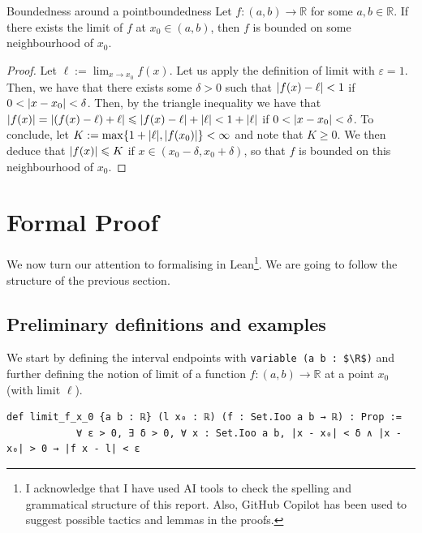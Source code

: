 \documentclass[a4paper,11pt]{article}
\theoremstyle{plain}
\newcommand{\R}{\ensuremath{\mathbb{R}}} %
\begin{document}
	\begin{lemma}{Boundedness around a point}{boundedness}
		\label{lem:boundedness}
		Let $f:(a,b)\rightarrow \R$ for some $a,b\in\R$. If there exists the limit of $f$ at $x_0\in(a,b)$, then $f$ is bounded on some neighbourhood of $x_0$.
	\end{lemma}
	\begin{proof}
		Let $\ell:=\lim_{x\rightarrow x_0}f(x)$. Let us apply the definition of limit with $\varepsilon=1$. Then, we have that there exists some $\delta>0$ such that $\abs{f(x)- \ell} < 1$ if $0 < \abs{x-x_0} < \delta$. Then, by the triangle inequality we have that $\abs{f(x)}= \abs{(f(x)-\ell) + \ell}\leqslant \abs{f(x)-\ell}+\abs{\ell}< 1 + \abs{\ell}$ if $0 < \abs{x-x_0} < \delta$. To conclude, let $K:=\max\{1 + \abs{\ell}, \abs{f(x_0)}\}<\infty$ and note that $K\geqslant0$. We then deduce that $\abs{f(x)}\leqslant K$ if $x \in (x_0-\delta, x_0 + \delta)$, so that $f$ is bounded on this neighbourhood of $x_0$.
	\end{proof}
	
	\section{Formal Proof}\label{sec:formal}
	 
	 We now turn our attention to formalising  in Lean\footnote{I acknowledge that I have used AI tools to check the spelling and grammatical structure of this report. Also, GitHub Copilot has been used to suggest possible tactics and lemmas in the proofs.}. We are going to follow the structure of the previous section. 
	 
	 \subsection{Preliminary definitions and examples}
	 
	 We start by defining the interval endpoints with \lstinline|variable (a b : $\R$)| and further defining the notion of limit of a function $f:(a,b)\rightarrow \R$ at a point $x_0$ (with limit $\ell$). \\
	
	\begin{lstlisting}[caption={Definition of limit of $f$ at $x_0$.}]
		def limit_f_x_0 {a b : ℝ} (l x₀ : ℝ) (f : Set.Ioo a b → ℝ) : Prop :=
			∀ ε > 0, ∃ δ > 0, ∀ x : Set.Ioo a b, |x - x₀| < δ ∧ |x - x₀| > 0 → |f x - l| < ε
	\end{lstlisting}
	
\end{document}
